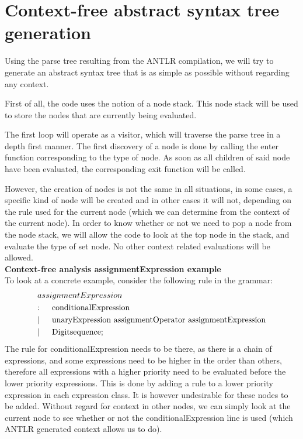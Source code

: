 \documentclass[12pt]{thesis}
\begin{document}
\section{Context-free abstract syntax tree generation}
Using the parse tree resulting from the ANTLR compilation, we will try to generate an abstract syntax tree that is as simple as possible without regarding any context. 

First of all, the code uses the notion of a node stack. This node stack will be used to store the nodes that are currently being evaluated.

The first loop will operate as a visitor, which will traverse the parse tree in a depth first manner. The first discovery of a node is done by calling the enter function corresponding to the type of node. As soon as all children of said node have been evaluated, the corresponding exit function will be called. 

However, the creation of nodes is not the same in all situations, in some cases, a specific kind of node will be created and in other cases it will not, depending on the rule used for the current node (which we can determine from the context of the current node). In order to know whether or not we need to pop a node from the node stack, we will allow the code to look at the top node in the stack, and evaluate the type of set node. No other context related evaluations will be allowed.\\
\newpage
\noindent
\textbf{Context-free analysis assignmentExpression example}\\
To look at a concrete example, consider the following rule in the grammar:
\begin{align*}
	&assignmentExpression\\
	&\text{:}\indent \text{conditionalExpression}\\
	&|\indent \text{unaryExpression assignmentOperator assignmentExpression}\\
	&|\indent \text{Digitsequence}; \\
\end{align*}
The rule for conditionalExpression needs to be there, as there is a chain of expressions, and some expressions need to be higher in the order than others, therefore all expressions with a higher priority need to be evaluated before the lower priority expressions. This is done by adding a rule to a lower priority expression in each expression class. It is however undesirable for these nodes to be added. Without regard for context in other nodes, we can simply look at the current node to see whether or not the conditionalExpression line is used (which ANTLR generated context allows us to do).
\end{document}
